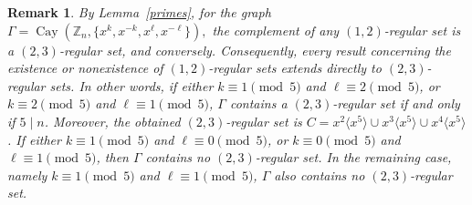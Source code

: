\documentclass[12pt]{article}
\newtheorem{remA}[propA]{Remark}
\begin{document}
\begin{remA}\label{rem:12}
	By Lemma~\ref{primes}, for the graph $\Gamma=\operatorname{Cay}(\mathbb{Z}_n,\{x^k,x^{-k},x^\ell,x^{-\ell}\}),$
	the complement of any \((1,2)\)-regular set is a \((2,3)\)-regular set, and conversely. Consequently, every result concerning the existence or nonexistence of \((1,2)\)-regular sets extends directly to \((2,3)\)-regular sets. In other words, if either \(k\equiv 1 \pmod{5}\) and \(\ell\equiv 2 \pmod{5}\), or \(k\equiv 2 \pmod{5}\) and \(\ell\equiv 1 \pmod{5}\),  \(\Gamma\) contains a \((2,3)\)-regular set if and only if \(5\mid n\). Moreover, the obtained \((2,3)\)-regular set is \(C=x^2\langle x^5\rangle\cup x^3\langle x^5\rangle\cup x^4\langle x^5\rangle\). If either \(k\equiv1\pmod{5}\) and \(\ell\equiv0\pmod{5}\), or \(k\equiv0\pmod{5}\) and \(\ell\equiv1\pmod{5}\), then \(\Gamma\) contains no \((2,3)\)-regular set. In the remaining case, namely \(k\equiv1\pmod{5}\) and \(\ell\equiv1\pmod{5}\), \(\Gamma\) also contains no \((2,3)\)-regular set.
\end{remA}	
\end{document}
